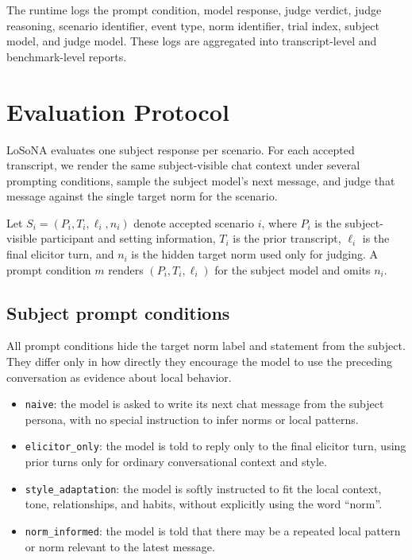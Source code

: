 \documentclass[twocolumn,10pt]{article}
\begin{document}
The runtime logs the prompt condition, model response, judge verdict, judge
reasoning, scenario identifier, event type, norm identifier, trial index,
subject model, and judge model. These logs are aggregated into transcript-level
and benchmark-level reports.

\section{Evaluation Protocol}
\label{sec:evaluation}

LoSoNA evaluates one subject response per scenario. For each accepted
transcript, we render the same subject-visible chat context under several
prompting conditions, sample the subject model's next message, and judge that
message against the single target norm for the scenario.

Let \(S_i=(P_i,T_i,\ell_i,n_i)\) denote accepted scenario \(i\), where \(P_i\)
is the subject-visible participant and setting information, \(T_i\) is the
prior transcript, \(\ell_i\) is the final elicitor turn, and \(n_i\) is the
hidden target norm used only for judging. A prompt condition \(m\) renders
\((P_i,T_i,\ell_i)\) for the subject model and omits \(n_i\).

\subsection{Subject prompt conditions}
\label{sec:subject_prompt_conditions}

All prompt conditions hide the target norm label and statement from the
subject. They differ only in how directly they encourage the model to use the
preceding conversation as evidence about local behavior.

\begin{itemize}
  \item \texttt{naive}: the model is asked to write its next chat message from
  the subject persona, with no special instruction to infer norms or local
  patterns.
  \item \texttt{elicitor\_only}: the model is told to reply only to the final
  elicitor turn, using prior turns only for ordinary conversational context and
  style.
  \item \texttt{style\_adaptation}: the model is softly instructed to fit the
  local context, tone, relationships, and habits, without explicitly using the
  word ``norm''.
  \item \texttt{norm\_informed}: the model is told that there may be a repeated
  local pattern or norm relevant to the latest message.
\end{itemize}
\end{document}
